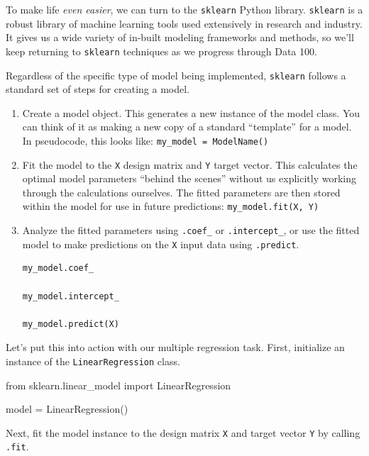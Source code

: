 \documentclass[
  letterpaper,
  DIV=11,
  numbers=noendperiod]{scrreprt}
\newenvironment{Shaded}{\begin{snugshade}}{\end{snugshade}}
\newcommand{\ImportTok}[1]{\textcolor[rgb]{0.00,0.46,0.62}{#1}}
\newcommand{\NormalTok}[1]{\textcolor[rgb]{0.00,0.23,0.31}{#1}}
\newcommand{\OperatorTok}[1]{\textcolor[rgb]{0.37,0.37,0.37}{#1}}
\begin{document}
To make life \emph{even easier}, we can turn to the \texttt{sklearn}
Python library. \texttt{sklearn} is a robust library of machine learning
tools used extensively in research and industry. It gives us a wide
variety of in-built modeling frameworks and methods, so we'll keep
returning to \texttt{sklearn} techniques as we progress through Data
100.

Regardless of the specific type of model being implemented,
\texttt{sklearn} follows a standard set of steps for creating a model.

\begin{enumerate}
\def\labelenumi{\arabic{enumi}.}
\item
  Create a model object. This generates a new instance of the model
  class. You can think of it as making a new copy of a standard
  ``template'' for a model. In pseudocode, this looks like:
  \texttt{my\_model\ =\ ModelName()}
\item
  Fit the model to the \texttt{X} design matrix and \texttt{Y} target
  vector. This calculates the optimal model parameters ``behind the
  scenes'' without us explicitly working through the calculations
  ourselves. The fitted parameters are then stored within the model for
  use in future predictions: \texttt{my\_model.fit(X,\ Y)}
\item
  Analyze the fitted parameters using \texttt{.coef\_} or
  \texttt{.intercept\_}, or use the fitted model to make predictions on
  the \texttt{X} input data using \texttt{.predict}.

\begin{verbatim}
my_model.coef_

my_model.intercept_

my_model.predict(X)
\end{verbatim}
\end{enumerate}

Let's put this into action with our multiple regression task. First,
initialize an instance of the \texttt{LinearRegression} class.

\begin{Shaded}
\begin{Highlighting}[]
\ImportTok{from}\NormalTok{ sklearn.linear\_model }\ImportTok{import}\NormalTok{ LinearRegression}

\NormalTok{model }\OperatorTok{=}\NormalTok{ LinearRegression()}
\end{Highlighting}
\end{Shaded}

Next, fit the model instance to the design matrix \texttt{X} and target
vector \texttt{Y} by calling \texttt{.fit}.
\end{document}
